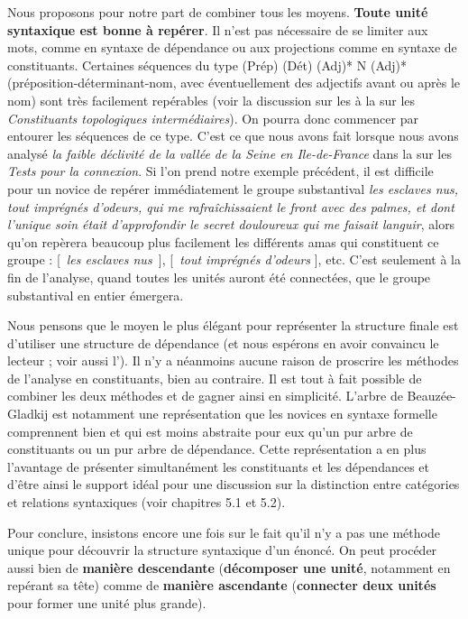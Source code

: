 Nous proposons pour notre part de combiner tous les moyens. \textbf{Toute unité syntaxique est bonne à repérer}. Il n’est pas nécessaire de se limiter aux mots, comme en syntaxe de dépendance ou aux projections comme en syntaxe de constituants. Certaines séquences du type (Prép) (Dét) (Adj)* N (Adj)* (préposition-déterminant-nom, avec éventuellement des adjectifs avant ou après le nom) sont très facilement repérables (voir la discussion sur les  à la  sur les \textit{Constituants topologiques intermédiaires}). On pourra donc commencer par entourer les séquences de ce type. C’est ce que nous avons fait lorsque nous avons analysé \textit{la faible déclivité de la vallée de la Seine en Ile-de-France} dans la  sur les \textit{Tests pour la connexion}. Si l’on prend notre exemple précédent, il est difficile pour un novice de repérer immédiatement le groupe substantival \textit{les esclaves nus, tout imprégnés d’odeurs, qui me rafraîchissaient le front avec des palmes, et dont l’unique soin était d’approfondir le secret douloureux qui me faisait languir}, alors qu’on repèrera beaucoup plus facilement les différents amas qui constituent ce groupe : [~\textit{les esclaves nus~}], [~\textit{tout imprégnés d’odeurs} ], etc. C’est seulement à la fin de l’analyse, quand toutes les unités auront été connectées, que le groupe substantival en entier émergera.

Nous pensons que le moyen le plus élégant pour représenter la structure finale est d’utiliser une structure de dépendance (et nous espérons en avoir convaincu le lecteur ; voir aussi l’). Il n’y a néanmoins aucune raison de proscrire les méthodes de l’analyse en constituants, bien au contraire. Il est tout à fait possible de combiner les deux méthodes et de gagner ainsi en simplicité. L’arbre de Beauzée-Gladkij est notamment une représentation que les novices en syntaxe formelle comprennent bien et qui est moins abstraite pour eux qu’un pur arbre de constituants ou un pur arbre de dépendance. Cette représentation a en plus l’avantage de présenter simultanément les constituants et les dépendances et d’être ainsi le support idéal pour une discussion sur la distinction entre catégories et relations syntaxiques (voir chapitres 5.1 et 5.2).

Pour conclure, insistons encore une fois sur le fait qu’il n’y a pas une méthode unique pour découvrir la structure syntaxique d’un énoncé. On peut procéder aussi bien de \textbf{manière descendante} (\textbf{décomposer une unité}, notamment en repérant sa tête) comme de \textbf{manière ascendante} (\textbf{connecter deux unités} pour former une unité plus grande).

